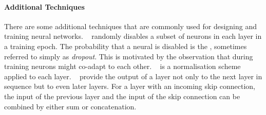 \documentclass[
	fontsize=10pt, %
	twoside=false, %
	secnumdepth=1, %
  toc=indentunnumbered %
]{kaobook}
\begin{document}









\paragraph{Additional Techniques} There are some additional techniques that are
commonly used for designing and training neural networks.
~\cite{srivastava_dropout_nodate} randomly disables a subset
  of neurons in each layer in a training epoch. The probability that a neural is
  disabled is the , sometimes referred to simply as
  \textit{dropout}. This is motivated by the observation that during training
  neurons might co-adapt to each other.
~\cite{ioffe_batch_nodate} is a normalisation
  scheme applied to each layer.   
~\cite{he_deep_2015} provide the output of a layer
  not only to the next layer in sequence but to even later layers. For a layer
  with an incoming skip connection, the input of the previous layer and the
  input of the skip connection can be combined by either sum or concatenation.
\end{document}

